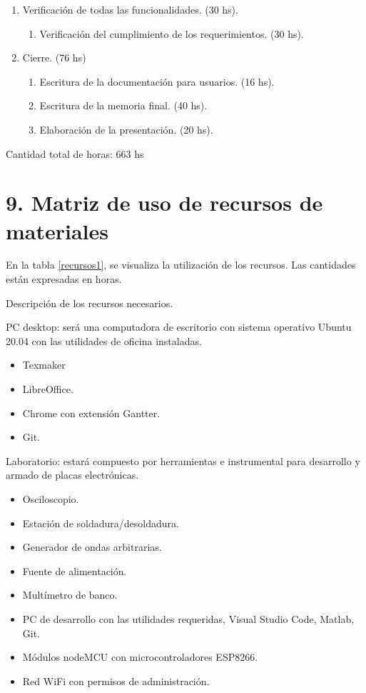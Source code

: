 \documentclass[11pt]{proyecto}
\begin{document}
\begin{enumerate}
\item Verificación de todas las funcionalidades. (30 hs).
	\begin{enumerate}
	\item Verificación del cumplimiento de los requerimientos.  (30 hs).
	\end{enumerate}		

\item Cierre.  (76 hs)
	\begin{enumerate}
	\item Escritura de la documentación para usuarios. (16 hs).
	\item Escritura de la memoria final. (40 hs).
	\item Elaboración de la presentación. (20 hs).
	\end{enumerate}
	
\end{enumerate}

Cantidad total de horas: 663 hs





\section{9. Matriz de uso de recursos de materiales}
\label{sec:recursos}
En la tabla \ref{recursos1}, se visualiza la utilización de los recursos. Las cantidades están expresadas en horas.

Descripción de los recursos necesarios.

PC desktop: será una computadora de escritorio con sistema operativo Ubuntu 20.04 con las utilidades de oficina instaladas.
\begin{itemize}
\item Texmaker
\item LibreOffice.
\item Chrome con extensión Gantter.
\item Git.
\end{itemize}

Laboratorio: estará compuesto por herramientas e instrumental para desarrollo y armado de placas electrónicas.
\begin{itemize}
\item Osciloscopio.
\item Estación de soldadura/desoldadura.
\item Generador de ondas arbitrarias.
\item Fuente de alimentación.
\item Multímetro de banco.
\item PC de desarrollo con las utilidades requeridas, Visual Studio Code, Matlab, Git.
\item Módulos nodeMCU con microcontroladores ESP8266.
\item Red WiFi con permisos de administración.
\end{itemize}
\end{document}
